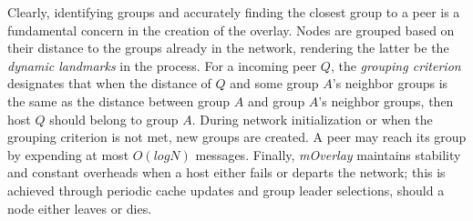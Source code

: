 Clearly, identifying groups and accurately finding the closest group 
to a peer is a fundamental concern in the creation of the overlay.
Nodes are grouped based on their distance to 
the groups already in the network, rendering
the latter be the \emph{dynamic landmarks} in the process. 
For a incoming peer $Q$, 
the \emph{grouping criterion} designates that when the distance of $Q$ and
some group $A$’s neighbor groups is the same as the distance
between group $A$ and group $A$’s neighbor groups, then host $Q$
should belong to group $A$. 
During network initialization or when the grouping
criterion is not met, new groups are created.
A peer may reach its group by expending at most $O(logN)$ messages.
Finally, \emph{mOverlay} maintains stability and constant 
overheads when a host either fails or departs the network;
this is achieved through periodic cache updates and group 
leader selections, should a node either leaves or dies.
%
%

